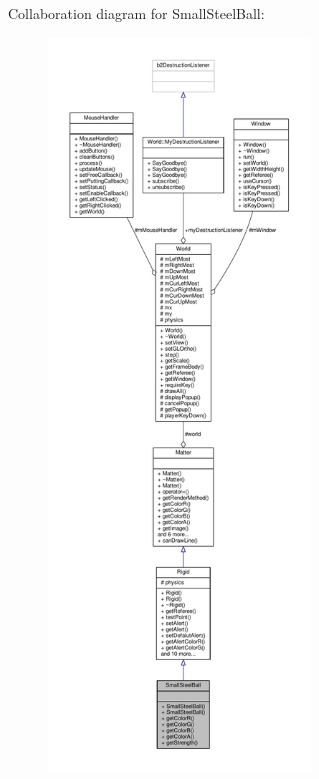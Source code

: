 Collaboration diagram for Small\+Steel\+Ball\+:\nopagebreak
\begin{figure}[H]
\begin{center}
\leavevmode
\includegraphics[height=550pt]{classSmallSteelBall__coll__graph}
\end{center}
\end{figure}
